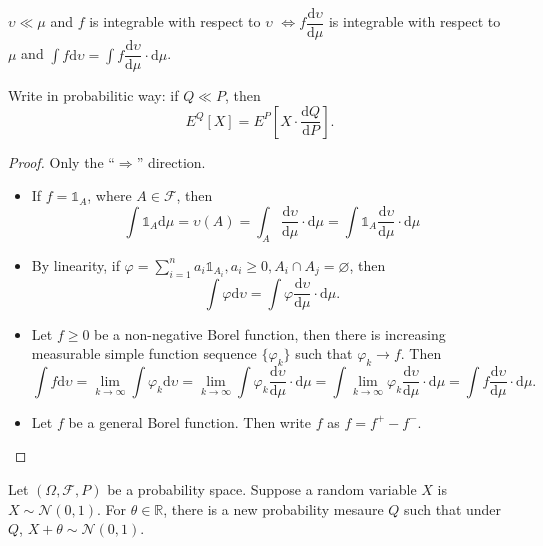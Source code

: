 \documentclass[11pt,singlecolumn, openany, citestyle=authoryear]{elegantbook}
\begin{document}
\begin{CJK}{UTF8}{gbsn}
\begin{proposition}
    $\upsilon \ll \mu$ and $f$ is integrable with respect to $\upsilon$
    $\iff f \dfrac{\mathrm{d}\upsilon}{\mathrm{d}\mu}$ is integrable with respect to $\mu$
    and $\displaystyle \int f\mathrm{d}\upsilon=\int f\dfrac{\mathrm{d}\upsilon}{\mathrm{d}\mu}\cdot \mathrm{d}\mu$.
\end{proposition}
\begin{remark}
    Write in probabilitic way: if $Q\ll P$, then 
    $$
    E^Q [X] = E^P [X\cdot \frac{\mathrm{d}Q}{\mathrm{d}P}].
    $$
\end{remark}
\begin{proof}Only the ``$\Longrightarrow$'' direction.
    \begin{itemize}
        \item If $f=\mathds{1}_A$, where $A \in \mathcal{F}$, then 
        $$
        \int \mathds{1}_A \mathrm{d}\mu=\upsilon(A)=
        \int_A \dfrac{\mathrm{d}\upsilon}{\mathrm{d}\mu}\cdot \mathrm{d}\mu=
        \int \mathds{1}_A \dfrac{\mathrm{d}\upsilon}{\mathrm{d}\mu}\cdot \mathrm{d}\mu
        $$
        \item By linearity, if $\varphi=\displaystyle \sum_{i=1}^n a_i\mathds{1}_{A_i},
        a_i\geqslant 0, A_i \cap A_j = \varnothing$, then 
        $$
        \int \varphi\mathrm{d}\upsilon = \int \varphi \dfrac{\mathrm{d}\upsilon}{\mathrm{d}\mu}\cdot \mathrm{d}\mu.
        $$
        \item Let $f\geqslant 0$ be a non-negative Borel function, then there is increasing measurable simple function 
        sequence $\{\varphi_k\}$ such that $\varphi_k\to f$. Then 
        $$
        \int f \mathrm{d}\upsilon = \lim_{k\to\infty}\int \varphi_k \mathrm{d}\upsilon = 
        \lim_{k\to\infty}\int \varphi_k \dfrac{\mathrm{d}\upsilon}{\mathrm{d}\mu}\cdot \mathrm{d}\mu
        =\int \lim_{k\to\infty}\varphi_k \dfrac{\mathrm{d}\upsilon}{\mathrm{d}\mu}\cdot \mathrm{d}\mu
        = \int f \dfrac{\mathrm{d}\upsilon}{\mathrm{d}\mu}\cdot \mathrm{d}\mu.
        $$
        \item Let $f$ be a general Borel function. Then write $f$ as $f=f^+-f^-$.
    \end{itemize}
\end{proof}
\begin{example}
    Let $(\Omega,\mathcal{F},P)$ be a probability space. Suppose a random variable 
    $X$ is $X\sim \mathcal{N}(0,1)$. For $\theta\in\mathbb{R}$, there is a new probability
    mesaure $Q$ such that under $Q$, $X+\theta \sim \mathcal{N}(0,1)$.

\end{example}
\end{CJK}
\end{document}
